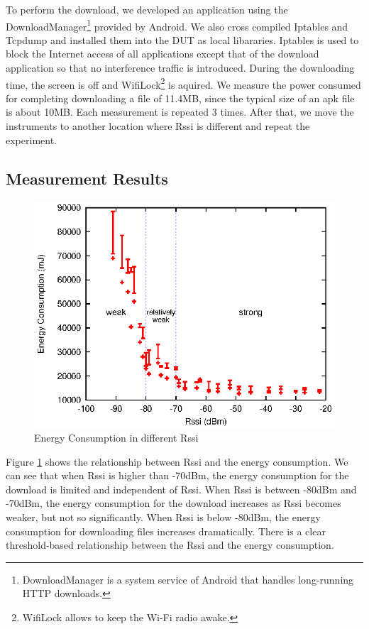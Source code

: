 \documentclass[journal]{IEEEtran}
\begin{document}
To perform the download, we developed an application using the DownloadManager\footnote[1]{DownloadManager is a
system service of Android that handles long-running HTTP downloads.} provided by Android. 
We also cross compiled Iptables and Tcpdump and installed them into the DUT as local libararies.
Iptables is used to block the Internet access of all applications 
except that of the download application so that no interference traffic is introduced. 
During the downloading time, the screen is off and WifiLock\footnote[2]{WifiLock allows to keep the Wi-Fi radio awake.}
is aquired. 
We measure the power consumed for 
completing downloading a file of 11.4MB, since the typical size of an apk file is about 10MB. 
Each measurement is repeated 3 times. After that, we move the instruments to 
another location where Rssi is different and repeat the experiment. 
\subsection{Measurement Results}
\begin{figure}
\centering
\includegraphics[scale=0.95]{rssi_energy.eps}
\caption{Energy Consumption in different Rssi}
\label{rssi_energy}
\end{figure}

Figure \ref{rssi_energy} shows the relationship between Rssi and the energy consumption. 
We can see that when Rssi is higher than -70dBm, 
the energy consumption for the download is limited and independent of Rssi.
When Rssi is between -80dBm and -70dBm, the energy consumption for the download increases as Rssi becomes weaker, but not so significantly.  
When Rssi is below -80dBm, the energy consumption for downloading files increases dramatically.
There is a clear threshold-based relationship between 
the Rssi and the energy consumption. 
\end{document}
